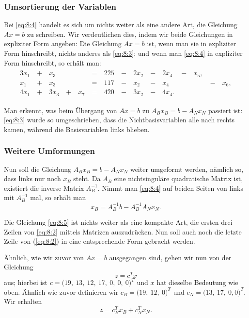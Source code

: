 \documentclass[smaller]{beamer}
\begin{document}
\begin{frame}
 \frametitle{Umsortierung der Variablen}
 Bei \eqref{eq:8:4} handelt es sich um nichts weiter als eine andere Art, die Gleichung $Ax=b$ zu schreiben. Wir verdeutlichen dies, indem wir beide Gleichungen in expliziter Form angeben: Die Gleichung $Ax=b$ ist, wenn man sie in expliziter Form hinschreibt, nichts anderes als \eqref{eq:8:3}; und wenn man \eqref{eq:8:4} in expliziter Form hinschreibt, so erhält man:
\begin{align*}
\begin{alignedat}{8}
3x_1 &\ + &\  x_3 &\   &\     &\ = &\ 225 &\ - &\ 2x_2 &\ - &\ 2x_4\ &\ - &\ x_5, &\   &\     \\
 x_1 &\ + &\  x_3 &\   &\     &\ = &\ 117 &\ - &\  x_2 &\ - &\  x_4\ &\   &\     &\ - &\ x_6, \\
4x_1 &\ + &\ 3x_3 &\ + &\ x_7 &\ = &\ 420 &\ - &\ 3x_2 &\ - &\ 4x_4. &\   &\     &\   &\     
\end{alignedat}
\end{align*}

Man erkennt, was beim Übergang von $Ax=b$ zu $A_Bx_B = b - A_Nx_N$ passiert ist: \eqref{eq:8:3} wurde so umgeschrieben, dass die \alert{Nichtbasisvariablen alle nach rechts kamen, während die Basisvariablen links blieben.}
\end{frame}

\begin{frame}
 \frametitle{Weitere Umformungen}
  Nun soll die Gleichung $A_Bx_B = b - A_Nx_N$ weiter umgeformt werden, nämlich so, dass links nur noch $x_B$ steht. Da $A_B$ eine nichtsinguläre quadratische Matrix  ist, existiert die inverse Matrix $A_B^{-1}$. Nimmt man \eqref{eq:8:4} auf beiden Seiten von links mit $A_B^{-1}$ mal, so erhält man
\begin{equation}
\label{eq:8:5}
x_B = A_B^{-1}b - A_B^{-1}A_Nx_N.
\end{equation}

\alert{Die Gleichung \eqref{eq:8:5} ist nichts weiter als eine kompakte Art, die ersten drei Zeilen von \eqref{eq:8:2} mittels Matrizen auszudrücken}. Nun soll auch noch die letzte Zeile von (\ref{eq:8:2}) in eine entsprechende Form gebracht werden. \\ \vspace*{0.2cm}

Ähnlich, wie wir zuvor von $Ax=b$ ausgegangen sind, gehen wir nun von der Gleichung 
\[
z = c^Tx
\]
aus; hierbei ist $c = {\bigl( 19,\ 13,\ 12,\ 17,\ 0,\ 0,\ 0 \bigr)}^T$ und $x$ hat dieselbe Bedeutung wie oben. Ähnlich wie zuvor definieren wir $c_B= {\bigl(19,\ 12,\ 0\bigr)}^T$ und $c_N = {\bigl(13,\ 17,\ 0, 0\bigr)}^T$. Wir erhalten
\[
z = c_B^Tx_B + c_N^Tx_N.
\]
\end{frame}
\end{document}
